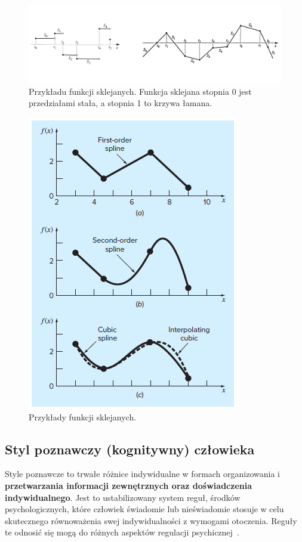 \documentclass[wi]{zut}
\begin{document}
\begin{figure}[H]
    \centering
    \includegraphics[width=0.8\linewidth]{images/spline.png}
    \caption{Przykładu funkcji sklejanych. Funkcja sklejana stopnia 0 jest przedziałami stała, a stopnia 1 to krzywa łamana.}
    \label{fig:spline}
\end{figure}


\begin{figure}[H]
    \centering
    \includegraphics[width=0.4\linewidth]{images/spline2.png}
    \caption{Przykłady funkcji sklejanych.}
    \label{fig:spline2}
\end{figure}

\subsection{Styl poznawczy (kognitywny) człowieka}

Style poznawcze to trwałe różnice indywidualne w formach organizowania i \textbf{przetwarzania informacji zewnętrznych oraz doświadczenia indywidualnego}. Jest to ustabilizowany system reguł, środków psychologicznych, które człowiek świadomie lub nieświadomie stosuje w celu skutecznego równoważenia swej indywidualności z wymogami otoczenia. Reguły te odnosić się mogą do różnych aspektów regulacji psychicznej~\cite{bator1991wyznaczniki}.
\end{document}
